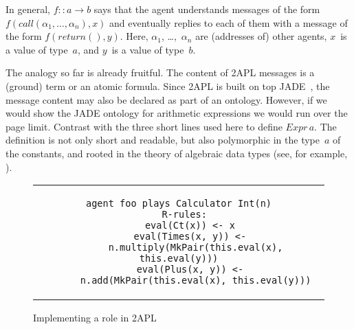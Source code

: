 \documentclass[conference,compsoc]{IEEEtran} %
\begin{document}
In general, $f::a\to b$ says that the agent understands messages of the
form $f(\mathit{call}(\alpha_1,\ldots,\alpha_n),x)$ and eventually replies
to each of them with a message of the form $f(\mathit{return}(),y)$. Here,
$\alpha_1$, \dots,~$\alpha_n$ are (addresses of) other agents, $x$~is a
value of type~$a$, and $y$~is a value of type~$b$.

The analogy so far is already fruitful. The content of 2APL messages is a
(ground) term or an atomic formula. Since 2APL is built on top
JADE~\cite{DBLP:books/sp/map2005/BellifemineBCP05}, the message content may
also be declared as part of an ontology. However, if we would show the JADE
ontology for arithmetic expressions we would run over the page limit.
Contrast with the three short lines used here to define $\mathit{Expr}\,a$.
The definition is not only short and readable, but also polymorphic in the
type~$a$ of the constants, and rooted in the theory of algebraic data types
(see, for example, \cite{DBLP:conf/ctcs/Hagino87}).

\begin{figure}\footnotesize %
\begin{center}
\begin{tabular}{c}
\begin{lstlisting}[style=me]
agent foo plays Calculator Int(n)
  R-rules:
    eval(Ct(x)) <- x
    eval(Times(x, y)) <-
      n.multiply(MkPair(this.eval(x), this.eval(y)))
    eval(Plus(x, y)) <-
      n.add(MkPair(this.eval(x), this.eval(y)))
\end{lstlisting}
\end{tabular}
\end{center}
\caption{Implementing a role in 2APL}\label{fig:roleimpl2APL}
\end{figure} %
\end{document}
